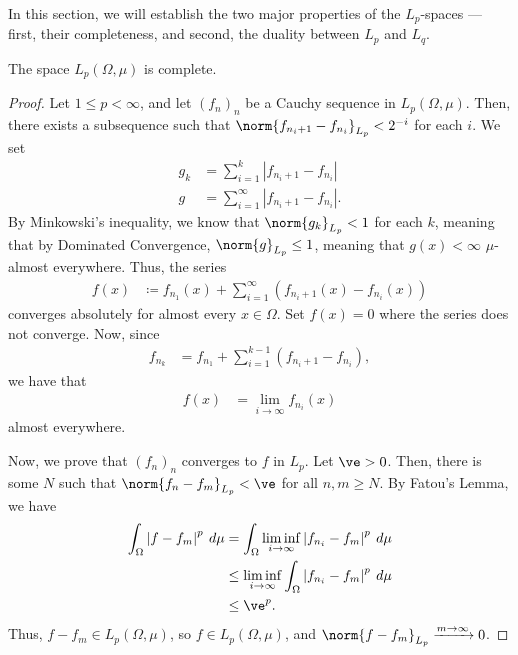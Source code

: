 \documentclass[10pt]{mypackage}
\begin{document}
In this section, we will establish the two major properties of the $L_p$-spaces --- first, their completeness, and second, the duality between $L_p$ and $L_q$.
\begin{theorem}
  The space $L_p\left( \Omega,\mu \right)$ is complete.
\end{theorem}
\begin{proof}
  Let $1 \leq p < \infty$, and let $\left( f_n \right)_n$ be a Cauchy sequence in $L_p\left( \Omega,\mu \right)$. Then, there exists a subsequence such that $\norm{f_{n_i + 1} - f_{n_i}}_{L_p} < 2^{-i}$ for each $i$. We set
  \begin{align*}
    g_k &= \sum_{i=1}^{k}\left\vert f_{n_i + 1} - f_{n_i} \right\vert\\
    g &= \sum_{i=1}^{\infty}\left\vert f_{n_i + 1} - f_{n_i} \right\vert.
  \end{align*}
  By Minkowski's inequality, we know that $\norm{g_k}_{L_p} < 1$ for each $k$, meaning that by Dominated Convergence, $\norm{g}_{L_p} \leq 1$, meaning that $g(x) < \infty$ $\mu$-almost everywhere. Thus, the series 
  \begin{align*}
    f(x) &\coloneq f_{n_1}(x) + \sum_{i=1}^{\infty}\left( f_{n_i + 1}\left( x \right) -  f_{n_i}\left( x \right)\right)
  \end{align*}
  converges absolutely for almost every $x\in \Omega$. Set $f(x) = 0$ where the series does not converge. Now, since
  \begin{align*}
    f_{n_k} &= f_{n_1} + \sum_{i=1}^{k-1}\left( f_{n_i + 1} - f_{n_i} \right),
  \end{align*}
  we have that
  \begin{align*}
    f(x) &= \lim_{i\rightarrow\infty}f_{n_i}(x)
  \end{align*}
  almost everywhere.\newline

  Now, we prove that $\left( f_n \right)_n$ converges to $f$ in $L_p$. Let $\ve > 0$. Then, there is some $N$ such that $\norm{f_n - f_m}_{L_p} < \ve$ for all $n,m \geq N$. By Fatou's Lemma, we have
  \begin{align*}
    \int_{\Omega}^{} \left\vert f-f_m \right\vert^{p}\:d\mu &= \int_{\Omega}^{} \liminf_{i\rightarrow\infty}\left\vert f_{n_i} - f_m \right\vert^{p}\:d\mu\\
                                                            &\leq \liminf_{i\rightarrow\infty}\int_{\Omega}^{} \left\vert f_{n_i} - f_m \right\vert^{p}\:d\mu\\
                                                            &\leq \ve^{p}.
  \end{align*}
  Thus, $f-f_m\in L_p\left( \Omega,\mu \right)$, so $f\in L_p\left( \Omega,\mu \right)$, and $\norm{f - f_m}_{L_p}\xrightarrow{m\rightarrow\infty} 0$.
\end{proof}
\end{document}
